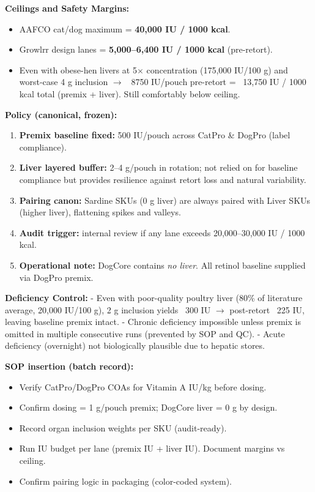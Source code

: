 \textbf{Ceilings and Safety Margins:}  
\begin{itemize}[leftmargin=1.2em]
  \item AAFCO cat/dog maximum = \textbf{40,000 IU / 1000 kcal}.  
  \item Growlrr design lanes = \textbf{5,000--6,400 IU / 1000 kcal} (pre-retort).  
  \item Even with obese-hen livers at 5$\times$ concentration (175,000 IU/100 g) and worst-case 4 g inclusion $\rightarrow$ ~8750 IU/pouch pre-retort = ~13,750 IU / 1000 kcal total (premix + liver). Still comfortably below ceiling.  
\end{itemize}

\textbf{Policy (canonical, frozen):}  
\begin{enumerate}[leftmargin=1.2em]
  \item \textbf{Premix baseline fixed:} 500 IU/pouch across CatPro \& DogPro (label compliance).  
  \item \textbf{Liver layered buffer:} 2--4 g/pouch in rotation; not relied on for baseline compliance but provides resilience against retort loss and natural variability.  
  \item \textbf{Pairing canon:} Sardine SKUs (0 g liver) are always paired with Liver SKUs (higher liver), flattening spikes and valleys.  
  \item \textbf{Audit trigger:} internal review if any lane exceeds 20,000--30,000 IU / 1000 kcal.  
  \item \textbf{Operational note:} DogCore contains \emph{no liver}. All retinol baseline supplied via DogPro premix.  
\end{enumerate}

\textbf{Deficiency Control:}  
- Even with poor-quality poultry liver (80\% of literature average, 20,000 IU/100 g), 2 g inclusion yields ~300 IU $\rightarrow$ post-retort ~225 IU, leaving baseline premix intact.  
- Chronic deficiency impossible unless premix is omitted in multiple consecutive runs (prevented by SOP and QC).  
- Acute deficiency (overnight) not biologically plausible due to hepatic stores.

\textbf{SOP insertion (batch record):}
\begin{itemize}[leftmargin=1.2em]
  \item Verify CatPro/DogPro COAs for Vitamin A IU/kg before dosing.  
  \item Confirm dosing = 1 g/pouch premix; DogCore liver = 0 g by design.  
  \item Record organ inclusion weights per SKU (audit-ready).  
  \item Run IU budget per lane (premix IU + liver IU). Document margins vs ceiling.  
  \item Confirm pairing logic in packaging (color-coded system).  
\end{itemize}
